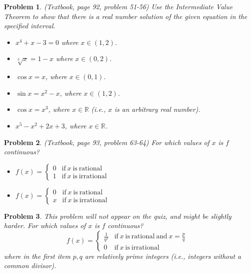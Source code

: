 \documentclass{article}
\newcommand{\doublebrace}[4]{\left\{\begin{array}{ll} #1 & #2 \\#3 & #4  \end{array} \right.}
\newtheorem{problem}{Problem}
\begin{document}
\begin{problem}
(Textbook, page 92, problem 51-56) Use the Intermediate Value Theorem to show that there is a real number solution of the given equation in the specified interval. 
\begin{multicols}{2}
\begin{itemize}
\item $x^4+x-3=0$ where $x\in (1,2)$.
\item $\sqrt[3]{x}=1-x$ where $x\in (0,2) $.
\item $\cos x=x$, where $x\in (0,1)$.
\item $\sin x=x^2-x$, where $x\in (1,2)$.
\item $\cos x=x^3$, where $x\in \mathbb R$ (i.e., $x$ is an arbitrary real number).
\item $x^5-x^2+2x+3$, where $x\in \mathbb R$.
\end{itemize}
\end{multicols}
\end{problem}
\begin{problem}(Textbook, page 93, problem 63-64) 
For which values of $x$ is $f$ continuous?
\begin{itemize}
\item $f(x)=\doublebrace{0}{\mathrm{if~} x\mathrm{~is~rational}}{1}{\mathrm{if~}x~\mathrm{is~irrational}}$
\item $f(x)=\doublebrace{0}{\mathrm{if~} x\mathrm{~is~rational}}{x}{\mathrm{if~}x~\mathrm{is~irrational}}$
\end{itemize}
\end{problem}
\begin{problem} This problem will not appear on the quiz, and might be slightly harder. For which values of $x$ is $f$ continuous?
\[f(x)=\doublebrace{\frac{1}{q^2}}{\mathrm{if~}x\mathrm{~is~rational~and~} x=\frac{p}{q} }{0}{\mathrm{if~}x~\mathrm{is~irrational}}\]
where in the first item $p,q$ are relatively prime integers (i.e., integers without a common divisor).
\end{problem}
\end{document}
